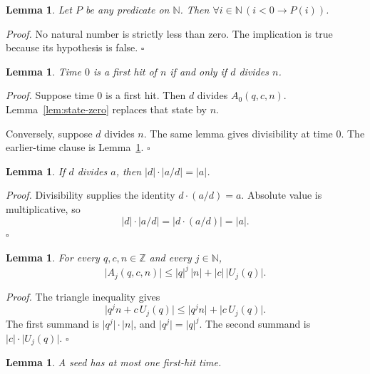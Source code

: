 \documentclass[11pt,letterpaper]{article}
\newcommand{\N}{\mathbb{N}}
\newcommand{\Z}{\mathbb{Z}}
\newtheorem{lemma}[theorem]{Lemma}
\newenvironment{proof}{\noindent\textit{Proof.}}{\hfill\(\square\)}
\begin{document}
\begin{lemma}
\label{lem:no-earlier}
Let \(P\) be any predicate on \(\N\). Then \(\forall i\in\N\,(i<0\rightarrow P(i))\).
\end{lemma}

\begin{proof}
No natural number is strictly less than zero. The implication is true because its hypothesis is false.
\end{proof}

\begin{lemma}
\label{lem:hit-zero}
Time \(0\) is a first hit of \(n\) if and only if \(d\) divides \(n\).
\end{lemma}

\begin{proof}
Suppose time \(0\) is a first hit. Then \(d\) divides \(A_0(q,c,n)\). Lemma~\ref{lem:state-zero} replaces that state by \(n\).

Conversely, suppose \(d\) divides \(n\). The same lemma gives divisibility at time \(0\). The earlier-time clause is Lemma~\ref{lem:no-earlier}.
\end{proof}

\begin{lemma}
\label{lem:exact-div}
If \(d\) divides \(a\), then \(\lvert d\rvert\cdot\lvert a/d\rvert=\lvert a\rvert\).
\end{lemma}

\begin{proof}
Divisibility supplies the identity \(d\cdot(a/d)=a\). Absolute value is multiplicative, so
\[
\lvert d\rvert\cdot\lvert a/d\rvert=\lvert d\cdot(a/d)\rvert=\lvert a\rvert.
\]
\end{proof}

\begin{lemma}
\label{lem:triangle}
For every \(q,c,n\in\Z\) and every \(j\in\N\),
\[
\lvert A_j(q,c,n)\rvert
\le \lvert q\rvert^j\,\lvert n\rvert+\lvert c\rvert\,\lvert U_j(q)\rvert.
\]
\end{lemma}

\begin{proof}
The triangle inequality gives
\[
\lvert q^j n+c\,U_j(q)\rvert
\le \lvert q^j n\rvert+\lvert c\,U_j(q)\rvert.
\]
The first summand is \(\lvert q^j\rvert\cdot\lvert n\rvert\), and \(\lvert q^j\rvert=\lvert q\rvert^j\). The second summand is \(\lvert c\rvert\cdot\lvert U_j(q)\rvert\).
\end{proof}

\begin{lemma}
\label{lem:unique}
A seed has at most one first-hit time.
\end{lemma}
\end{document}
